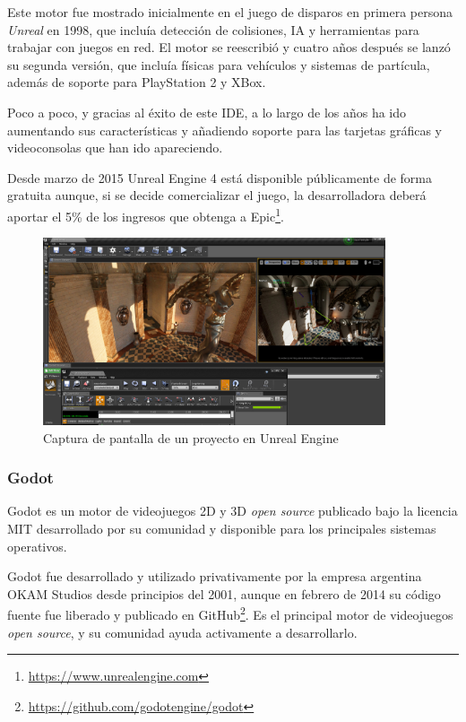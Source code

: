 Este motor fue mostrado inicialmente en el juego de disparos en primera persona \textit{Unreal} en 1998, que incluía detección de colisiones, IA y herramientas para trabajar con juegos en red. El motor se reescribió y cuatro años después se lanzó su segunda versión, que incluía físicas para vehículos y sistemas de partícula, además de soporte para PlayStation 2 y XBox.

Poco a poco, y gracias al éxito de este \acs{IDE}, a lo largo de los años ha ido aumentando sus características y añadiendo soporte para las tarjetas gráficas y videoconsolas que han ido apareciendo.

Desde marzo de 2015 Unreal Engine 4 está disponible públicamente de forma gratuita aunque, si se decide comercializar el juego, la desarrolladora deberá aportar el 5\% de los ingresos que obtenga a Epic\footnote{\url{https://www.unrealengine.com}}.

\begin{figure}[!h]
\begin{center}
\includegraphics[width=0.9\textwidth]{imagenes/2/unreal-engine-4.jpg}
\caption{Captura de pantalla de un proyecto en Unreal Engine}
\label{fig:unreal}
\end{center}
\end{figure}

\subsubsection{Godot}

Godot es un motor de videojuegos 2D y 3D \textit{open source} publicado bajo la licencia \acs{MIT} desarrollado por su comunidad y disponible para los principales sistemas operativos.

Godot fue desarrollado y utilizado privativamente por la empresa argentina OKAM Studios desde principios del 2001, aunque en febrero de 2014 su código fuente fue liberado y publicado en GitHub\footnote{\url{https://github.com/godotengine/godot}}. Es el principal motor de videojuegos \textit{open source}, y su comunidad ayuda activamente a desarrollarlo. 

